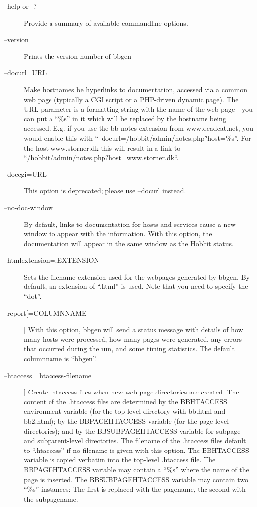  \begin{description}
\item[--help or -?] Provide a summary of available commandline options. 

 

\item[--version] Prints the version number of bbgen 

 

\item[--docurl=URL] Make hostnames be hyperlinks to documentation,
  accessed via a common web page (typically a CGI script or a
  PHP-driven dynamic page). The URL parameter is a formatting string
  with the name of the web page - you can put a ``\%s'' in it which
  will be replaced by the hostname being accessed. E.g. if you use the
  bb-notes extension from www.deadcat.net, you would enable this with
  ``--docurl=/hobbit/admin/notes.php?host=\%s''. For the host
  www.storner.dk this will result in a link to
  ``/hobbit/admin/notes.php?host=www.storner.dk``. 


 

\item[--doccgi=URL] This option is deprecated; please use --docurl instead. 

 

\item[--no-doc-window] By default, links to documentation for hosts
  and services cause a new window to appear with the information. With
  this option, the documentation will appear in the same window as the
  Hobbit status. 


 

\item[--htmlextension=.EXTENSION] Sets the filename extension used for
  the webpages generated by bbgen. By default, an extension of
  ``.html'' is used. Note that you need to specify the ``dot''. 


 

\item[--report[=COLUMNNAME]] With this option, bbgen will send a
  status message with details of how many hosts were processed, how
  many pages were generated, any errors that occurred during the run,
  and some timing statistics. The default columnname is ``bbgen''. 


 

\item[--htaccess[=htaccess-filename]] Create .htaccess files when new
  web page directories are created. The content of the .htaccess files
  are determined by the BBHTACCESS environment variable (for the
  top-level directory with bb.html and bb2.html); by the
  BBPAGEHTACCESS variable (for the page-level directories); and by the
  BBSUBPAGEHTACCESS variable for subpage- and subparent-level
  directories. The filename of the .htaccess files default to
  ``.htaccess'' if no filename is given with this option. The
  BBHTACCESS variable is copied verbatim into the top-level .htaccess
  file. The BBPAGEHTACCESS variable may contain a ``\%s'' where the
  name of the page is inserted. The BBSUBPAGEHTACCESS variable may
  contain two ``\%s'' instances: The first is replaced with the
  pagename, the second with the subpagename. 



\end{description}
